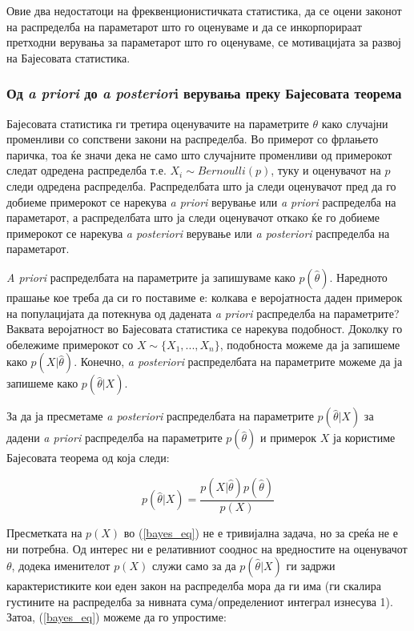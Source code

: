 \documentclass[12pt]{article}
\numberwithin{equation}{section}
\begin{document}
Овие два недостатоци на фреквенционистичката статистика, да се оцени законот на распределба на параметарот што го оценуваме и да се инкорпорираат претходни верувања за параметарот што го оценуваме, се мотивацијата за развој на Бајесовата статистика.

\subsubsection{Од \textit{a priori} до \textit{a posterior}i верувања преку Бајесовата теорема}

Бајесовата статистика ги третира оценувачите на параметрите \(\theta\) како случајни променливи со сопствени закони на распределба. Во примерот со фрлањето паричка, тоа ќе значи дека не само што случајните променливи од примерокот следат одредена распределба т.е. \(X_i \sim Bernoulli(p)\), туку и оценувачот на \(p\) следи одредена распределба. Распределбата што ја следи оценувачот пред да го добиеме примерокот се нарекува \textit{a priori} верување или \textit{a priori} распределба на параметарот, а распределбата што ја следи оценувачот откако ќе го добиеме примерокот се нарекува \textit{a posteriori} верување или \textit{a posteriori} распределба на параметарот.

\textit{A priori} распределбата на параметрите ја запишуваме како \(p(\widehat{\theta})\). Наредното прашање кое треба да си го поставиме е: колкава е веројатноста даден примерок на популацијата да потекнува од дадената \textit{a priori} распределба на параметрите? Ваквата веројатност во Бајесовата статистика се нарекува подобност. Доколку го обележиме примерокот со \(X \sim \{X_1, ..., X_n\}\), подобноста можеме да ја запишеме како \(p(X|\widehat{\theta})\). Конечно, \textit{a posteriori} распределбата на параметрите можеме да ја запишеме како \(p(\widehat{\theta}|X)\).

За да ја пресметаме \textit{a posteriori} распределбата на параметрите \(p(\widehat{\theta}|X)\) за дадени \textit{a priori} распределба на параметрите \(p(\widehat{\theta})\) и примерок \(X\) ја користиме Бајесовата теорема \cite{wiki:bayes_theorem} од која следи:

\begin{equation}\label{bayes_eq}
p(\widehat{\theta}|X) = \frac{p(X|\widehat{\theta})p(\widehat{\theta})}{p(X)}
\end{equation}

Пресметката на \(p(X)\) во (\ref{bayes_eq}) не е тривијална задача, но за среќа не е ни потребна. Од интерес ни е релативниот сооднос на вредностите на оценувачот \(\theta\), додека именителот \(p(X)\) служи само за да \(p(\widehat{\theta}|X)\) ги задржи карактеристиките кои еден закон на распределба мора да ги има (ги скалира густините на распределба за нивната сума/определениот интеграл изнесува 1). Затоа, (\ref{bayes_eq}) можеме да го упростиме:
\end{document}
